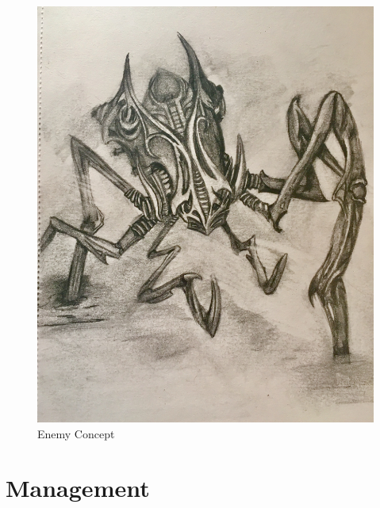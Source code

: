 \documentclass[12pt,titlepage]{article}
\begin{document}
\begin{figure}[H]
    \caption{Enemy Concept}
    \label{fig:enemy_concept}
    \centering
    \includegraphics[width=0.35\textheight]{../../graphics/spider}
\end{figure}


\newpage
\section{Management}
\end{document}
